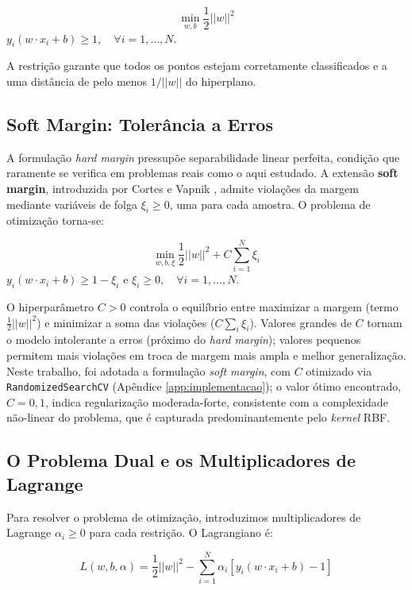 \documentclass[12pt, a4paper, oneside]{report}
\begin{document}
\begin{equation}
    \min_{w, b} \frac{1}{2} ||w||^2
\end{equation}
 $y_i(w \cdot x_i + b) \ge 1, \quad \forall i=1, \dots, N$.

A restrição garante que todos os pontos estejam corretamente classificados e a uma distância de pelo menos $1/||w||$ do hiperplano.

\subsection{Soft Margin: Tolerância a Erros}
\label{sec:svm_soft}

A formulação \textit{hard margin} pressupõe separabilidade linear perfeita, condição que raramente se verifica em problemas reais como o aqui estudado. A extensão \textbf{soft margin}, introduzida por Cortes e Vapnik \cite{cortes1995}, admite violações da margem mediante variáveis de folga $\xi_i \ge 0$, uma para cada amostra. O problema de otimização torna-se:

\begin{equation}
    \min_{w, b, \xi} \frac{1}{2} ||w||^2 + C \sum_{i=1}^N \xi_i
\end{equation}
 $y_i(w \cdot x_i + b) \ge 1 - \xi_i$ e $\xi_i \ge 0, \quad \forall i=1, \dots, N$.

O hiperparâmetro $C > 0$ controla o equilíbrio entre maximizar a margem (termo $\tfrac{1}{2}||w||^2$) e minimizar a soma das violações ($C \sum_i \xi_i$). Valores grandes de $C$ tornam o modelo intolerante a erros (próximo do \textit{hard margin}); valores pequenos permitem mais violações em troca de margem mais ampla e melhor generalização. Neste trabalho, foi adotada a formulação \textit{soft margin}, com $C$ otimizado via \texttt{RandomizedSearchCV} (Apêndice \ref{app:implementacao}); o valor ótimo encontrado, $C = 0{,}1$, indica regularização moderada-forte, consistente com a complexidade não-linear do problema, que é capturada predominantemente pelo \textit{kernel} RBF.

\subsection{O Problema Dual e os Multiplicadores de Lagrange}

Para resolver o problema de otimização, introduzimos multiplicadores de Lagrange $\alpha_i \ge 0$ para cada restrição. O Lagrangiano é:

\begin{equation}
    L(w, b, \alpha) = \frac{1}{2} ||w||^2 - \sum_{i=1}^N \alpha_i [y_i(w \cdot x_i + b) - 1]
\end{equation}
\end{document}
